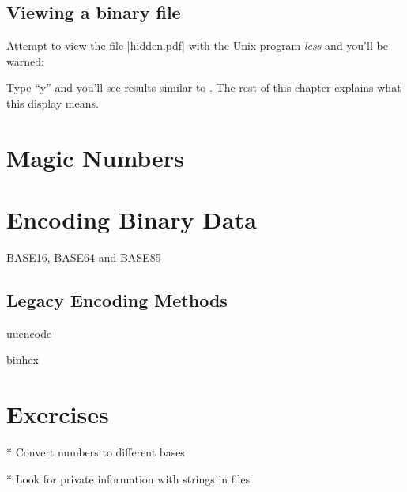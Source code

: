 \subsection{Viewing a binary file}

Attempt to view the file |hidden.pdf| with the
Unix program \emph{less} and you'll be warned:


Type ``y'' and you'll see results similar to
. The rest of this chapter explains what
this display means.

\section{Magic Numbers}

\section{Encoding Binary Data}

BASE16, BASE64 and BASE85

\subsection{Legacy Encoding Methods}
uuencode

binhex


\section{Exercises}
* Convert numbers to different bases

* Look for private information with strings in files





